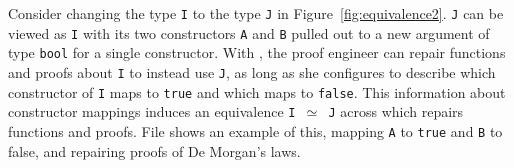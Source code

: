 Consider changing the type \lstinline{I} to the type \lstinline{J} 
in Figure~\ref{fig:equivalence2}.
\lstinline{J} can be viewed as \lstinline{I} with its two constructors \lstinline{A} and \lstinline{B} pulled out to a
new argument of type \lstinline{bool} for a single constructor.
With \toolnamec, the proof engineer can repair functions and proofs about \lstinline{I} to instead use \lstinline{J},
as long as she configures \toolnamec to describe which constructor 
of \lstinline{I} maps to \lstinline{true} and which maps to \lstinline{false}.
This information about constructor mappings induces an equivalence \lstinline{I }$\simeq$\lstinline{ J}
across which \toolnamec repairs functions and proofs.
File \href{https://github.com/uwplse/pumpkin-pi/blob/v2.0.0/plugin/coq/playground/constr_refactor.v}{} shows an example of this, mapping \lstinline{A} to \lstinline{true} and \lstinline{B} to false,
and repairing proofs of De Morgan's laws. %
%

%

